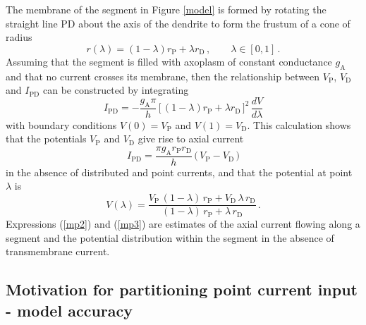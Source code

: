 The membrane of the segment in Figure \ref{model} is formed by
rotating the straight line PD about the axis of the dendrite to
form the frustum of a cone of radius
\begin{equation}\label{mp1}
r(\lambda)=(1-\lambda)r_\mathrm{P}+\lambda r_\mathrm{D} \,,\qquad
\lambda\in[0,1]\,.
\end{equation}
Assuming that the segment is filled with axoplasm of
constant conductance $g_\mathrm{A}$ and that no current
crosses its membrane, then the relationship between
$V_\mathrm{P}$, $V_\mathrm{D}$ and $I_\mathrm{PD}$ can be
constructed by integrating
\[
I_\mathrm{PD}=-\frac{g_\mathrm{A}\pi}{h}\,\Big[\,
(1-\lambda)r_\mathrm{P}+\lambda r_\mathrm{D}\,\Big]^2\,
\frac{dV}{d\lambda}
\]
with boundary conditions $V(0)=V_\mathrm{P}$ and
$V(1)=V_\mathrm{D}$. This calculation shows that the potentials
$V_\mathrm{P}$ and $V_\mathrm{D}$ give rise to axial current
\begin{equation}\label{mp2}
I_\mathrm{PD}= \frac{\pi g_\mathrm{A} r_\mathrm{P}
r_\mathrm{D}}{h}\,\big(\,V_\mathrm{P}-V_\mathrm{D}\,\big)
\end{equation}
in the absence of distributed and point currents, and that the
potential at point $\lambda$ is
\begin{equation}\label{mp3}
V(\lambda) = \frac{V_\mathrm{P}\,(1-\lambda)\,
r_\mathrm{P}+V_\mathrm{D}\,\lambda\,r_\mathrm{D}}
{(1-\lambda)\,r_\mathrm{P}+\lambda\,r_\mathrm{D}}\,.
\end{equation}
Expressions (\ref{mp2}) and (\ref{mp3}) are estimates of the axial
current flowing along a segment and the potential distribution within
the segment in the absence of transmembrane current.

\subsection{Motivation for partitioning point current input - model
accuracy}\label{assertion}

